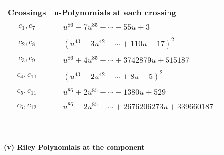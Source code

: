 \documentclass[1p]{elsarticle_modified}
\theoremstyle{definition}
\begin{document}
\begin{tabular}{m{50pt}|m{274pt}}
Crossings & \hspace{64pt}u-Polynomials at each crossing \\
\hline $$\begin{aligned}c_{1},c_{7}\end{aligned}$$&$\begin{aligned}
&u^{86}-7 u^{85}+\cdots-55 u+3
\end{aligned}$\\
\hline $$\begin{aligned}c_{2},c_{8}\end{aligned}$$&$\begin{aligned}
&(u^{43}-3 u^{42}+\cdots+110 u-17)^{2}
\end{aligned}$\\
\hline $$\begin{aligned}c_{3},c_{9}\end{aligned}$$&$\begin{aligned}
&u^{86}+4 u^{85}+\cdots+3742879 u+515187
\end{aligned}$\\
\hline $$\begin{aligned}c_{4},c_{10}\end{aligned}$$&$\begin{aligned}
&(u^{43}-2 u^{42}+\cdots+8 u-5)^{2}
\end{aligned}$\\
\hline $$\begin{aligned}c_{5},c_{11}\end{aligned}$$&$\begin{aligned}
&u^{86}+2 u^{85}+\cdots-1380 u+529
\end{aligned}$\\
\hline $$\begin{aligned}c_{6},c_{12}\end{aligned}$$&$\begin{aligned}
&u^{86}-2 u^{85}+\cdots+2676206273 u+339660187
\end{aligned}$\\
\hline
\end{tabular}\\~\\
\newpage\renewcommand{\arraystretch}{1}
\flushleft \textbf{(v) Riley Polynomials at the component}\newline \\
\end{document}
